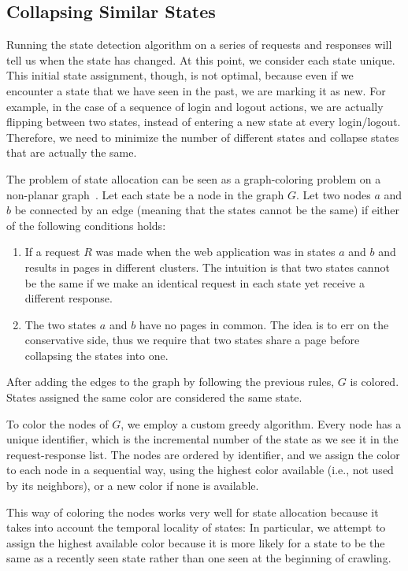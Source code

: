 \subsection{Collapsing Similar States}

Running the state detection algorithm on a series of requests and responses
will tell us when the state has changed. At this point, we consider each state
unique. This initial state assignment, though, is not optimal, because even if we
encounter a state that we have seen in the past, we are marking it as new. For
example, in the case of a sequence of login and logout actions, we are actually
flipping between two states, instead of entering a new state at every
login/logout. Therefore, we need to minimize the number of different states and collapse
states that are actually the same.

The problem of state allocation can be seen as a graph-coloring problem on a
non-planar graph~\cite{jensen94:graph}. Let each state be a node in the graph
$G$. Let two nodes $a$ and $b$ be connected by an edge (meaning that the
states cannot be the same) if either of the
following conditions holds:
\begin{enumerate}
 \item If a request $R$ was made when the web application was in states $a$ and
   $b$ and results in pages in different clusters. The intuition is that two
   states cannot be the same if we make an identical request in each state yet
   receive a different response.
 \item The two states $a$ and $b$ have no pages in common. The idea is to err
   on the conservative side, thus we require that two states share a page
   before collapsing the states into one.
\end{enumerate}

After adding the edges to the graph by following the previous rules, $G$ is
colored. States assigned the same color are considered the same state.

To color the nodes of $G$, we employ a custom greedy algorithm. Every node has a
unique identifier, which is the incremental number of the state as we see it in
the request-response list. The nodes are ordered by identifier, and we assign the color to
each node in a sequential way, using the highest color available (i.e., not
used by its neighbors), or a new color if none is available.

This way of coloring the nodes works very well for state allocation because it
takes into account the temporal locality of states: In particular, we attempt to
assign the highest available color because it is more likely for a state to be
the same as a recently seen state rather than one seen at the beginning of
crawling.

